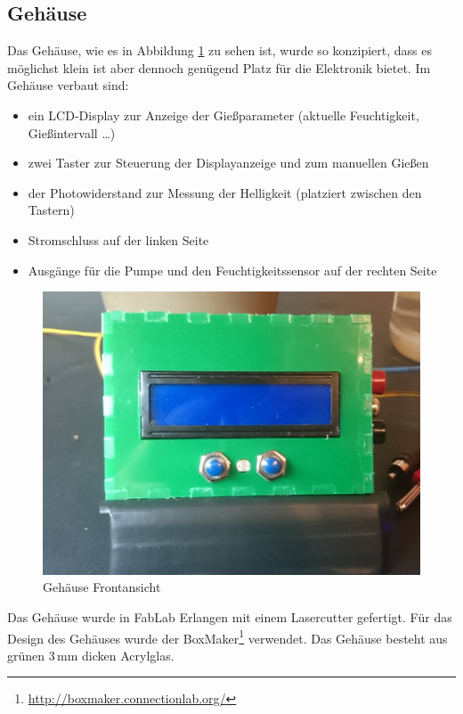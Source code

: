 	

\subsection{Gehäuse}
	Das Gehäuse, wie es in Abbildung \ref{fig-Gehäuse} zu sehen ist, wurde so konzipiert, dass es möglichst klein ist aber dennoch genügend Platz für die Elektronik bietet.
	Im Gehäuse verbaut sind:
\begin{itemize}
	\item ein LCD-Display zur Anzeige der Gießparameter (aktuelle Feuchtigkeit, Gießintervall \dots)
	\item zwei Taster zur Steuerung der Displayanzeige und zum manuellen Gießen
	\item der Photowiderstand zur Messung der Helligkeit (platziert zwischen den Tastern)
	\item Stromschluss auf der linken Seite
	\item Ausgänge für die Pumpe und den Feuchtigkeitssensor auf der rechten Seite

\end{itemize}	

	\begin{figure}[!h]
	\centering
	\includegraphics[width=0.9\linewidth]{bilder/_boxFron1.jpg}	
	\caption{Gehäuse Frontansicht}
	\label{fig-Gehäuse}
	\end{figure}
	
Das Gehäuse wurde in FabLab Erlangen mit einem Lasercutter gefertigt. 
Für das Design des Gehäuses wurde der BoxMaker\footnote{ \href{http://boxmaker.connectionlab.org/}{http://boxmaker.connectionlab.org/}} verwendet. 
Das Gehäuse besteht aus grünen 3\,mm dicken Acrylglas.
	

